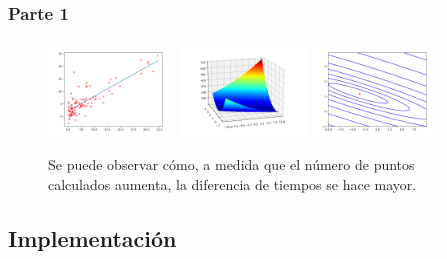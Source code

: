 \documentclass[11pt]{article}
\begin{document}
\subsubsection {Parte 1}
 \begin{figure}[h!]
    \begin{center}
    \includegraphics[width=0.3\textwidth]{gradiantDescenseResult.png}
    \includegraphics[width=0.3\textwidth]{costMap.png}
    \includegraphics[width=0.3\textwidth]{costMap2.png}
    \caption{Se puede observar cómo, a medida que el número de puntos calculados aumenta, la diferencia de tiempos se hace mayor.}
    \label{fig:Resultados}
    \end{center}
 \end{figure}
\subsection{Implementación}


\end{document}
